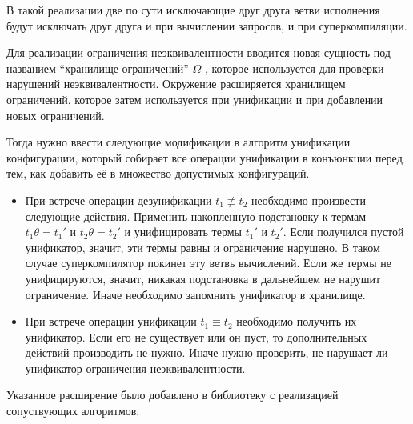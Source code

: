 В такой реализации две по сути исключающие друг друга ветви исполнения будут исключать друг друга
и при вычислении запросов, и при суперкомпиляции.

Для реализации ограничения неэквивалентности вводится новая сущность под названием
``хранилище ограничений'' $\Omega$ , которое используется для проверки
нарушений неэквивалентности. Окружение расширяется хранилищем ограничений, которое затем используется
при унификации и при добавлении новых ограничений.

Тогда нужно ввести следующие модификации в алгоритм унификации конфигурации, который собирает все
операции унификации в конъюнкции перед тем, как добавить её в множество допустимых конфигураций.
\begin{itemize}
\item При встрече операции дезунификации $t_1 \not\equiv t_2$ необходимо произвести следующие действия.
      Применить накопленную подстановку к термам $t_1 \theta = t_1'$ и $t_2 \theta = t_2'$ и 
      унифицировать термы $t_1'$ и $t_2'$. Если получился пустой унификатор, значит, эти термы
      равны и ограничение нарушено. В таком случае суперкомпилятор покинет эту
      ветвь вычислений. Если же термы не унифицируются, значит, никакая подстановка
      в дальнейшем не нарушит ограничение. Иначе необходимо запомнить унификатор в хранилище.
\item При встрече операции унификации $t_1 \equiv t_2$ необходимо получить их унификатор.
      Если его не существует или он пуст, то дополнительных действий производить не нужно.
	  Иначе нужно проверить, не нарушает ли унификатор ограничения неэквивалентности.
\end{itemize}

Указанное расширение было добавлено в библиотеку с реализацией сопуствующих алгоритмов.
